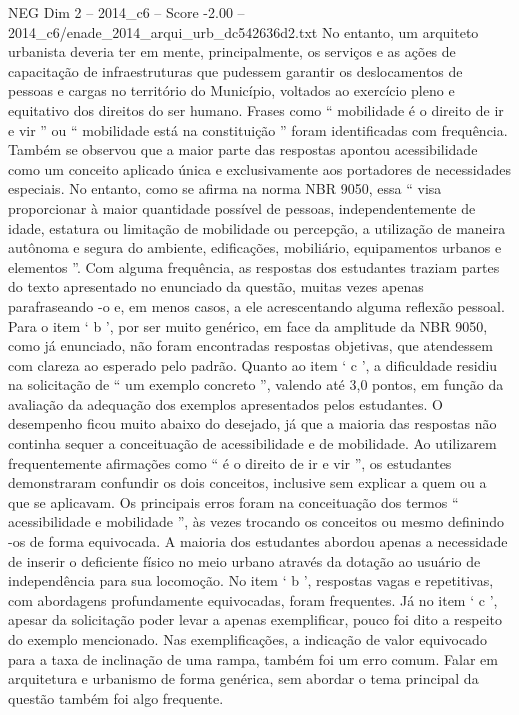 \begin{textsample}{NEG Dim 2 – 2014\_c6 – Score -2.00 – 2014\_c6/enade\_2014\_arqui\_urb\_dc542636d2.txt}
No entanto, um arquiteto urbanista deveria ter em mente, principalmente, os serviços e as ações de capacitação de infraestruturas que pudessem garantir os deslocamentos de pessoas e cargas no território do Município, voltados ao exercício pleno e equitativo dos direitos do ser humano.
Frases como “ mobilidade é o direito de ir e vir ” ou “ mobilidade está na constituição ” foram identificadas com frequência.
Também se observou que a maior parte das respostas apontou acessibilidade como um conceito aplicado única e exclusivamente aos portadores de necessidades especiais.
No entanto, como se afirma na norma NBR 9050, essa “ visa proporcionar à maior quantidade possível de pessoas, independentemente de idade, estatura ou limitação de mobilidade ou percepção, a utilização de maneira autônoma e segura do ambiente, edificações, mobiliário, equipamentos urbanos e elementos ”.
Com alguma frequência, as respostas dos estudantes traziam partes do texto apresentado no enunciado da questão, muitas vezes apenas parafraseando -o e, em menos casos, a ele acrescentando alguma reflexão pessoal.
Para o item ‘ b ’, por ser muito genérico, em face da amplitude da NBR 9050, como já enunciado, não foram encontradas respostas objetivas, que atendessem com clareza ao esperado pelo padrão.
Quanto ao item ‘ c ’, a dificuldade residiu na solicitação de “ um exemplo concreto ”, valendo até 3,0 pontos, em função da avaliação da adequação dos exemplos apresentados pelos estudantes.
O desempenho ficou muito abaixo do desejado, já que a maioria das respostas não continha sequer a conceituação de acessibilidade e de mobilidade.
Ao utilizarem frequentemente afirmações como “ é o direito de ir e vir ”, os estudantes demonstraram confundir os dois conceitos, inclusive sem explicar a quem ou a que se aplicavam.
Os principais erros foram na conceituação dos termos “ acessibilidade e mobilidade ”, às vezes trocando os conceitos ou mesmo definindo -os de forma equivocada.
A maioria dos estudantes abordou apenas a necessidade de inserir o deficiente físico no meio urbano através da dotação ao usuário de independência para sua locomoção.
No item ‘ b ’, respostas vagas e repetitivas, com abordagens profundamente equivocadas, foram frequentes.
Já no item ‘ c ’, apesar da solicitação poder levar a apenas exemplificar, pouco foi dito a respeito do exemplo mencionado.
Nas exemplificações, a indicação de valor equivocado para a taxa de inclinação de uma rampa, também foi um erro comum.
Falar em arquitetura e urbanismo de forma genérica, sem abordar o tema principal da questão também foi algo frequente.

\end{textsample}
